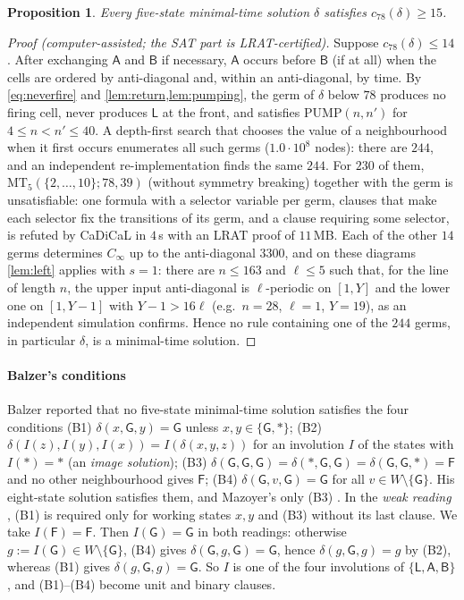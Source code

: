 \documentclass[3p]{elsarticle}
\newtheorem{proposition}[theorem]{Proposition}
\theoremstyle{remark}
\begin{document}
\begin{proposition}\label{prop:germs}
Every five-state minimal-time solution $\delta$ satisfies $c_{78}(\delta)\ge15$.
\end{proposition}

\begin{proof}[Proof (computer-assisted; the SAT part is LRAT-certified)]
Suppose $c_{78}(\delta)\le14$. After exchanging $\mathsf A$ and $\mathsf B$ if
necessary, $\mathsf A$ occurs before $\mathsf B$ (if at all) when the cells are
ordered by anti-diagonal and, within an anti-diagonal, by time. By
\eqref{eq:neverfire} and \cref{lem:return,lem:pumping}, the germ of $\delta$
below $78$ produces no firing cell, never produces $\mathsf L$ at the front,
and satisfies $\mathrm{PUMP}(n,n')$ for $4\le n<n'\le40$. A depth-first search
that chooses the value of a neighbourhood when it first occurs enumerates all
such germs ($1.0\cdot10^8$ nodes): there are $244$, and an independent
re-implementation finds the same $244$. For $230$ of them,
$\mathrm{MT}_5(\{2,\dots,10\};78,39)$ (without symmetry breaking) together
with the germ is unsatisfiable: one formula with a selector variable per germ,
clauses that make each selector fix the transitions of its germ, and a clause
requiring some selector, is refuted by CaDiCaL in $4$\,s with an LRAT proof of
$11$\,MB. Each of the other $14$ germs determines $C_\infty$ up to the
anti-diagonal $3300$, and on these diagrams \cref{lem:left} applies with
$s=1$: there are $n\le163$ and $\ell\le5$ such that, for the line of length
$n$, the upper input anti-diagonal is $\ell$-periodic on $[1,Y]$ and the lower
one on $[1,Y-1]$ with $Y-1>16\ell$ (e.g.\ $n=28$, $\ell=1$, $Y=19$), as an
independent simulation confirms. Hence no rule containing one of the $244$
germs, in particular $\delta$, is a minimal-time solution.
\end{proof}

\paragraph{Balzer's conditions} Balzer \cite[p.~37]{Balzer67} reported that no
five-state minimal-time solution satisfies the four conditions
(B1) $\delta(x,\mathsf G,y)=\mathsf G$ unless $x,y\in\{\mathsf G,\ast\}$;
(B2) $\delta(I(z),I(y),I(x))=I(\delta(x,y,z))$ for an involution $I$ of the
states with $I(\ast)=\ast$ (an \emph{image solution});
(B3) $\delta(\mathsf G,\mathsf G,\mathsf G)=\delta(\ast,\mathsf G,\mathsf
G)=\delta(\mathsf G,\mathsf G,\ast)=\mathsf F$ and no other neighbourhood gives
$\mathsf F$;
(B4) $\delta(\mathsf G,v,\mathsf G)=\mathsf G$ for all $v\in W\setminus\{\mathsf
G\}$. His eight-state solution satisfies them, and Mazoyer's only (B3)
\cite{Mazoyer86Lyon}. In the \emph{weak reading} \cite{Yunes93}, (B1) is
required only for working states $x,y$ and (B3) without its last clause. We
take $I(\mathsf F)=\mathsf F$. Then $I(\mathsf G)=\mathsf G$ in both readings:
otherwise $g:=I(\mathsf G)\in W\setminus\{\mathsf G\}$, (B4) gives
$\delta(\mathsf G,g,\mathsf G)=\mathsf G$, hence $\delta(g,\mathsf G,g)=g$ by
(B2), whereas (B1) gives $\delta(g,\mathsf G,g)=\mathsf G$. So $I$ is one of the
four involutions of $\{\mathsf L,\mathsf A,\mathsf B\}$, and (B1)--(B4) become
unit and binary clauses.
\end{document}
